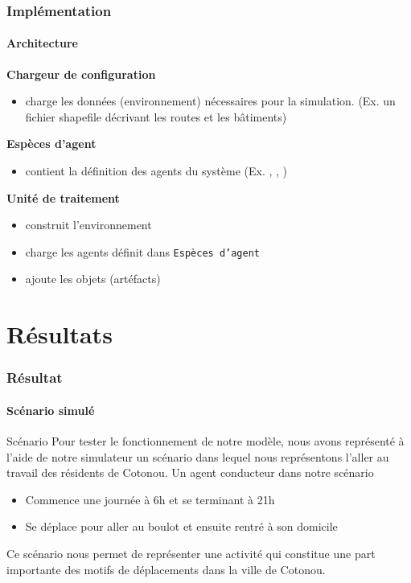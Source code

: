\begin{frame}
    \frametitle{Implémentation}
    \framesubtitle{Architecture}
    \textbf{Chargeur de configuration}
    \begin{itemize}
        \item charge les données (environnement) nécessaires pour la simulation. (Ex. un fichier shapefile décrivant les routes et les bâtiments)

    \end{itemize}

    \textbf{Espèces d'agent}
    \begin{itemize}
        \item contient la définition des agents du système (Ex. \aTMoto{}, \aTBus{}, \aPolicier{})
    \end{itemize}

    \textbf{Unité de traitement}
    \begin{itemize}
        \item construit l'environnement
        \item charge les agents définit dans \texttt{Espèces d'agent}
        \item ajoute les objets (artéfacts)
    \end{itemize}

\end{frame}


\section{Résultats}\label{results}
\begin{frame}
    \frametitle{Résultat}
    \framesubtitle{Scénario simulé}

    \begin{block}{Scénario}
        Pour tester le fonctionnement de notre modèle, nous avons représenté à l'aide de notre simulateur un scénario dans lequel nous représentons l'aller au travail des résidents de Cotonou.
        Un agent conducteur dans notre scénario
        \begin{itemize}
            \item Commence une journée à 6h et se terminant à 21h
            \item Se déplace pour aller au boulot et ensuite rentré à son domicile
        \end{itemize}
        Ce scénario nous permet de représenter une activité qui constitue une part importante des motifs de déplacements dans la ville de Cotonou.
    \end{block}
\end{frame}

